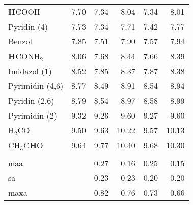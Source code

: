 \begin{table}[ht!]
{\begin{tabular}{lr|rr|rr}
    \textbf{H}COOH & 7.70   & 7.34  & 8.04  & 7.34  & 8.01 \\
    Pyridin (4) & 7.73  & 7.34  & 7.71  & 7.42  & 7.77 \\
    Benzol & 7.85  & 7.51  & 7.90   & 7.57  & 7.94 \\
    \textbf{H}CONH$_{2}$ & 8.06  & 7.68  & 8.44  & 7.66  & 8.39 \\
    Imidazol (1) & 8.52  & 7.85  & 8.37  & 7.87  & 8.38 \\
    Pyrimidin (4,6) & 8.77  & 8.49  & 8.91  & 8.54  & 8.94 \\
    Pyridin (2,6) & 8.79  & 8.54  & 8.97  & 8.58  & 8.99 \\
    Pyrimidin (2) & 9.32  & 9.26  & 9.60   & 9.27  & 9.60 \\
    H$_{2}$CO  & 9.50   & 9.63  & 10.22 & 9.57  & 10.13 \\
    CH$_{3}$C\textbf{H}O & 9.64  & 9.77  & 10.40  & 9.68  & 10.30 \\
          &       &       &       &       &  \\
    \ac{maa}   &       & 0.27  & 0.16  & 0.25  & 0.15 \\
    \ac{sa}  &       & 0.23  & 0.23  & 0.20   & 0.20 \\
    \ac{maxa}  &       & 0.82  & 0.76  & 0.73  & 0.66 \\
    \end{tabular}}%
  \label{tab:1hshifts}%
\end{table}%
\FloatBarrier

